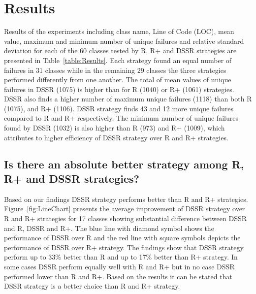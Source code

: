 \documentclass[conference]{IEEEtran}
\begin{document}
\section{Results}\label{sec:res}
Results of the experiments including class name, Line of Code (LOC), mean value, maximum and minimum number of unique failures and relative standard deviation for each of the 60 classes tested by R, R+ and DSSR strategies are presented in Table~\ref{table:Results}. Each strategy found an equal number of failures in 31 classes while in the remaining 29 classes the three strategies performed differently from one another. The total of mean values of unique failures in DSSR (1075) is higher than for R (1040) or R+ (1061) strategies. 
DSSR also finds a higher number of maximum unique failures (1118) than both R (1075), and R+ (1106). DSSR strategy finds 43 and 12 more unique failures compared to R and R+ respectively. The minimum number of unique failures found by DSSR (1032) is also higher than R (973) and R+ (1009), which attributes to higher efficiency of DSSR strategy over R and R+ strategies. 


\subsection{Is there an absolute better strategy among R, R+ and DSSR strategies?}
\noindent Based on our findings DSSR strategy performs better than R and R+ strategies.  Figure~\ref{fig:LineChart} presents the average improvement of DSSR strategy over R and R+ strategies for 17 classes showing substantial difference between DSSR and R, DSSR and R+. The blue line with diamond symbol shows the performance of DSSR over R and the red line with square symbols depicts the performance of DSSR over R+ strategy. The findings show that DSSR strategy perform up to 33\% better than R and up to 17\% better than R+ strategy. In some cases DSSR perform equally well with R and R+ but in no case DSSR performed lower than R and R+. Based on the results it can be stated that DSSR strategy is a better choice than R and R+ strategy. %

\end{document}
